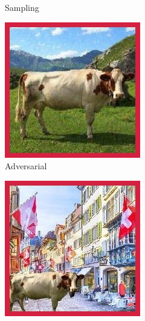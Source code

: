 \begin{figure}
\begin{subfigure}[b]{0.22\textwidth}
        \caption{Sampling}
    \end{subfigure}
    \hfill
    \begin{subfigure}[b]{0.22\textwidth}
        \centering
        \includegraphics[width=\textwidth]{img/introduction/cow_fgsm.jpg}
        \caption{Adversarial}
    \end{subfigure}
    \hfill
    \begin{subfigure}[b]{0.22\textwidth}
        \centering
        \includegraphics[width=\textwidth]{img/introduction/cow_ood.jpg}

\end{subfigure}
\end{figure}
